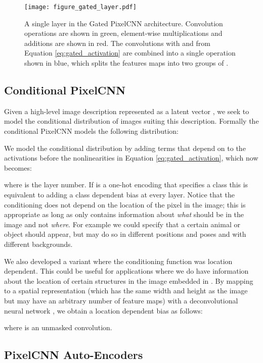 \documentclass{article}
\begin{document}
\begin{figure}[h]
  \centering
  \texttt{[image: figure\_gated\_layer.pdf]}
  \hspace{50pt}

  \caption{A single layer in the Gated PixelCNN architecture. Convolution operations are shown in green, element-wise multiplications and additions are shown in red. The convolutions with  and  from Equation \ref{eq:gated_activation} are combined into a single operation shown in blue, which splits the  features maps into two groups of .}
  \label{fig:layer}
\end{figure}

\subsection{Conditional PixelCNN}

Given a high-level image description represented as a latent vector , we seek to model the conditional distribution  of images suiting this description. 
Formally the conditional PixelCNN models the following distribution:

We model the conditional distribution by adding terms that depend on  to the activations before the nonlinearities in Equation \ref{eq:gated_activation}, which now becomes:

where  is the layer number. If  is a one-hot encoding that specifies a class this is equivalent to adding a class dependent bias at every layer. Notice that the conditioning does not depend on the location of the pixel in the image; this is appropriate as long as  only contains information about \emph{what} should be in the image and not \emph{where}. For example we could specify that a certain animal or object should appear, but may do so in different positions and poses and with different backgrounds.

We also developed a variant where the conditioning function was location dependent. This could be useful for applications where we do have information about the location of certain structures in the image embedded in . By mapping  to a spatial representation  (which has the same width and height as the image but may have an arbitrary number of feature maps) with a deconvolutional neural network , we obtain a location dependent bias as follows:

where  is an unmasked  convolution.

\subsection{PixelCNN Auto-Encoders}
\label{sec:ae}
\end{document}
